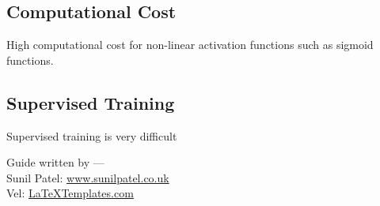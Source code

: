 \subsection{Computational Cost}
High computational cost for non-linear activation functions such as sigmoid functions.

\subsection{Supervised Training}
Supervised training is very difficult



\begin{flushright}
Guide written by ---\\
Sunil Patel: \href{http://www.sunilpatel.co.uk}{www.sunilpatel.co.uk}\\
Vel: \href{http://www.LaTeXTemplates.com}{LaTeXTemplates.com}
\end{flushright}
